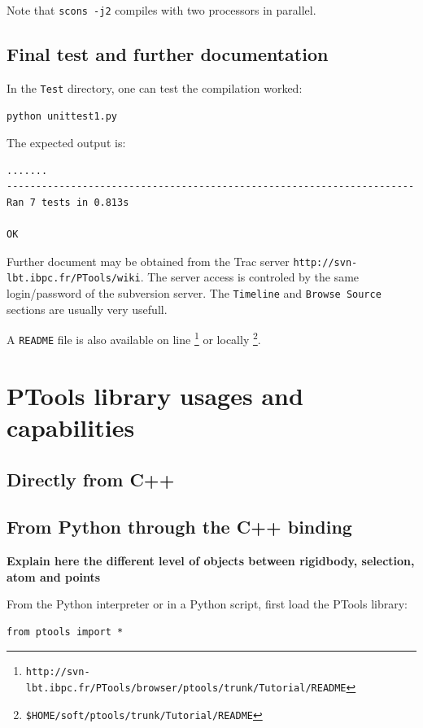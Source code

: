 \documentclass[12pt,a4paper]{article}
\begin{document}
Note that {\tt scons -j2} compiles with two processors in parallel.

\subsection{Final test and further documentation}

In the {\tt Test} directory, one can test the compilation worked:
\begin{verbatim}
python unittest1.py
\end{verbatim}

The expected output is:
\begin{verbatim}
....... 
---------------------------------------------------------------------- 
Ran 7 tests in 0.813s 

OK 
\end{verbatim}

Further document may be obtained from the Trac server {\tt http://svn-lbt.ibpc.fr/PTools/wiki}. 
The server access is controled by the same login/password of the subversion server. The {\tt Timeline}
and {\tt Browse Source} sections are usually very usefull.

A {\tt README} file is also available on line 
\footnote{\tt http://svn-lbt.ibpc.fr/PTools/browser/ptools/trunk/Tutorial/README} 
or locally \footnote{\tt \$HOME/soft/ptools/trunk/Tutorial/README}.


\section{PTools library usages and capabilities}

\subsection{Directly from C++}

\subsection{From Python through the C++ binding}

\vspace*{2cm}
{\bf Explain here the different level of objects between rigidbody, selection, atom and points}
\vspace*{2cm}


From the Python interpreter or in a Python script, first load the PTools library:
\begin{verbatim}
from ptools import *
\end{verbatim}
\end{document}
